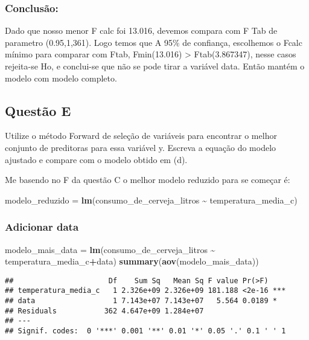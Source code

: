 \documentclass[
]{article}
\newenvironment{Shaded}{\begin{snugshade}}{\end{snugshade}}
\newcommand{\FunctionTok}[1]{\textcolor[rgb]{0.13,0.29,0.53}{\textbf{#1}}}
\newcommand{\NormalTok}[1]{#1}
\newcommand{\OtherTok}[1]{\textcolor[rgb]{0.56,0.35,0.01}{#1}}
\newcommand{\SpecialCharTok}[1]{\textcolor[rgb]{0.81,0.36,0.00}{\textbf{#1}}}
\begin{document}
\hypertarget{conclusuxe3o-2}{%
\subsubsection{Conclusão:}\label{conclusuxe3o-2}}

Dado que nosso menor F calc foi 13.016, devemos compara com F Tab de
parametro (0.95,1,361). Logo temos que A 95\% de confiança, escolhemos o
Fcalc mínimo para comparar com Ftab, Fmin(13.016) \textgreater{}
Ftab(3.867347), nesse casos rejeita-se Ho, e conclui-se que não se pode
tirar a variável data. Então mantém o modelo com modelo completo.

\hypertarget{questuxe3o-e}{%
\subsection{Questão E}\label{questuxe3o-e}}

Utilize o método Forward de seleção de variáveis para encontrar o melhor
conjunto de preditoras para essa variável y. Escreva a equação do modelo
ajustado e compare com o modelo obtido em (d).

Me basendo no F da questão C o melhor modelo reduzido para se começar é:

\begin{Shaded}
\begin{Highlighting}[]
\NormalTok{modelo\_reduzido }\OtherTok{=} \FunctionTok{lm}\NormalTok{(consumo\_de\_cerveja\_litros }\SpecialCharTok{\textasciitilde{}}\NormalTok{ temperatura\_media\_c)}
\end{Highlighting}
\end{Shaded}

\hypertarget{adicionar-data}{%
\subsubsection{Adicionar data}\label{adicionar-data}}

\begin{Shaded}
\begin{Highlighting}[]
\NormalTok{modelo\_mais\_data }\OtherTok{=} \FunctionTok{lm}\NormalTok{(consumo\_de\_cerveja\_litros }\SpecialCharTok{\textasciitilde{}}\NormalTok{ temperatura\_media\_c}\SpecialCharTok{+}\NormalTok{data)}
\FunctionTok{summary}\NormalTok{(}\FunctionTok{aov}\NormalTok{(modelo\_mais\_data))}
\end{Highlighting}
\end{Shaded}

\begin{verbatim}
##                      Df    Sum Sq   Mean Sq F value Pr(>F)    
## temperatura_media_c   1 2.326e+09 2.326e+09 181.188 <2e-16 ***
## data                  1 7.143e+07 7.143e+07   5.564 0.0189 *  
## Residuals           362 4.647e+09 1.284e+07                   
## ---
## Signif. codes:  0 '***' 0.001 '**' 0.01 '*' 0.05 '.' 0.1 ' ' 1
\end{verbatim}
\end{document}
